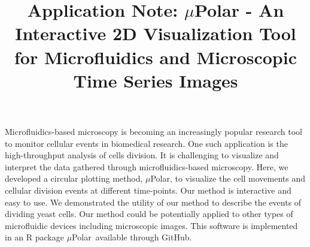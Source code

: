\documentclass[conference]{IEEEtran}
\begin{document}
\title{ Application Note: $\mu$Polar \-- An Interactive 2D Visualization Tool for  Microfluidics and  Microscopic Time Series Images }


\maketitle


\begin{Summary}

Microfluidics-based microscopy is becoming an increasingly popular research tool to monitor cellular events in biomedical research. One such application is the high-throughput analysis of cells division. It is challenging to visualize and interpret the data gathered through microfluidics-based microscopy. Here, we developed a circular plotting method, $\mu$Polar, to visualize the cell movements and cellular division events at different time-points. Our method is interactive and easy to use. We demonstrated the utility of our method to describe the events of dividing yeast cells. Our method could be potentially applied to other types of microfluidic devices including microscopic images. This software is implemented in an R package $\mu$Polar\ available through GitHub.


\end{Summary}
\end{document}

